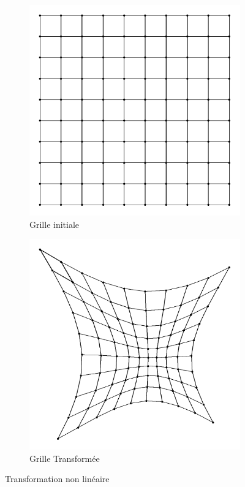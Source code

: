 \begin{figure}[ht]
\centering
\begin{subfigure}[b]{0.45\textwidth}
\includegraphics[width=\textwidth]{images/ima1.png}
\caption{Grille initiale}
\label{fig:uni_mesh}
\end{subfigure}
\begin{subfigure}[b]{0.45\textwidth}
\includegraphics[width=\textwidth]{images/ima3.png}
\caption{Grille Transformée}
\label{fig:trnlin_mesh}
\end{subfigure}
\caption{Transformation non linéaire}\label{fig:trnlin}
\end{figure}

